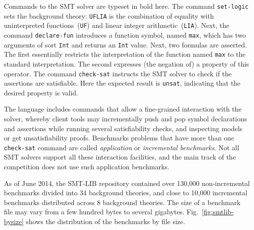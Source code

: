 \documentclass[twoside,11pt]{article}
\begin{document}
Commands to the SMT solver are typeset in bold here.  The command
\lstinline{set-logic} sets the background theory: \lstinline{UFLIA} is
the combination of equality with uninterpreted
functions~(\lstinline{UF}) and linear integer
arithmetic~(\lstinline{LIA}). Next, the command
\lstinline{declare-fun} introduces a function symbol, named
\lstinline{max}, which has two arguments of sort \lstinline{Int} and
returns an \lstinline{Int} value. Next, two formulas are asserted. The
first essentially restricts the interpretation of the function named
\lstinline{max} to the standard interpretation. The second expresses
(the negation of) a property of this operator. The command
\lstinline{check-sat} instructs the SMT solver to check if the assertions
are satisfiable. Here the expected result is \lstinline{unsat},
indicating that the desired property is valid.

The language includes commands that allow a fine-grained interaction
with the solver, whereby client tools may incrementally push and pop
symbol declarations and assertions while running several
satisfiability checks, and inspecting models or get unsatisfiability
proofs. Benchmarks problems that have more than one
\lstinline{check-sat} command are called \emph{application} or \emph{incremental
  benchmarks}. Not all SMT solvers support all these interaction
facilities, and the main track of the competition does not use such
application benchmarks.

As of June 2014, the SMT-LIB repository contained over 130,000
non-incremental benchmarks divided into 34 background theories, and
close to 10,000 incremental benchmarks distributed across 8 background
theories. The size of a benchmark file may vary from a few hundred
bytes to several gigabytes. Fig.~\ref{fig:smtlib-bysize} shows the
distribution of the benchmarks by file size.
\end{document}
